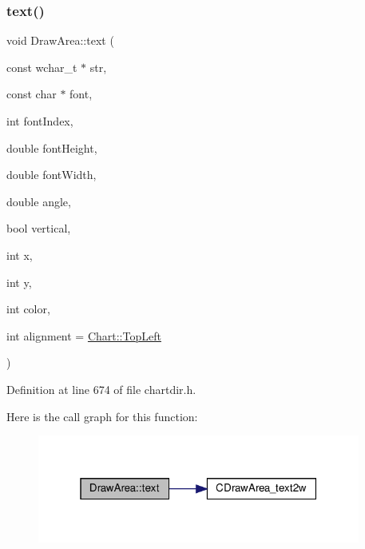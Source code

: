 \subsubsection{\texorpdfstring{text()}{text()}\hspace{0.1cm}{\footnotesize\ttfamily [4/8]}}
{\footnotesize\ttfamily void Draw\+Area\+::text (\begin{DoxyParamCaption}\item[{const wchar\+\_\+t $\ast$}]{str,  }\item[{const char $\ast$}]{font,  }\item[{int}]{font\+Index,  }\item[{double}]{font\+Height,  }\item[{double}]{font\+Width,  }\item[{double}]{angle,  }\item[{bool}]{vertical,  }\item[{int}]{x,  }\item[{int}]{y,  }\item[{int}]{color,  }\item[{int}]{alignment = {\ttfamily \hyperlink{namespace_chart_ae222e51ce11a254450b6ddfbc862680aa0bf92d1d2d6713aa62e92b86b9a8532f}{Chart\+::\+Top\+Left}} }\end{DoxyParamCaption})\hspace{0.3cm}{\ttfamily [inline]}}



Definition at line 674 of file chartdir.\+h.

Here is the call graph for this function\+:
\nopagebreak
\begin{figure}[H]
\begin{center}
\leavevmode
\includegraphics[width=301pt]{class_draw_area_aa73c60ff46156933aebcab3674dd3f44_cgraph}
\end{center}
\end{figure}
\mbox{\label{class_draw_area_a5c05c0f1f76ff3b364cf4cf25de6e1a0}} 

